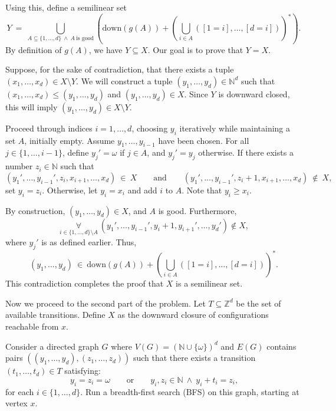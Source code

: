 \documentclass[12pt]{article}
\begin{document}
	Using this, define a semilinear set
	\[ Y \ = \ \bigcup_{A \subseteq \{1, \ldots, d\} \ \wedge \ A \
	\text{is good}} \left( \text{down}(g(A)) + \left( \bigcup_{i \in A}
	([1 = i], \ldots, [d = i]) \right)^{\ast} \right) \text{.} \]
	By definition of \(g(A)\), we have \(Y \subseteq X\). Our goal is to prove
	that \(Y = X\).
	
	\medskip
	
	Suppose, for the sake of contradiction, that there exists a tuple \((x_{1},
	\ldots, x_{d}) \in X \setminus Y\). We will construct a tuple \((y_{1},
	\ldots, y_{d}) \in \mathbb{N}^{d}\) such that \((x_{1}, \ldots, x_{d})
	\leqslant (y_{1}, \ldots, y_{d})\) and \((y_{1}, \ldots, y_{d}) \in X\).
	Since \(Y\) is downward closed, this will imply \((y_{1}, \ldots, y_{d}) \in
	X \setminus Y\).
	
	\medskip
	
	Proceed through indices \(i = 1, \ldots, d\), choosing \(y_{i}\) iteratively
	while maintaining a set \(A\), initially empty. Assume \(y_{1}, \ldots,
	y_{i - 1}\) have been chosen. For all \(j \in \{1, \ldots, i - 1\}\), define
	\(y_{j}' = \omega\) if \(j \in A\), and \(y_{j}' = y_{j}\) otherwise. If
	there exists a number \(z_{i} \in \mathbb{N}\) such that
	\[ (y_{1}', \ldots, y_{i - 1}', z_{i}, x_{i + 1}, \ldots, x_{d}) \ \in \ X
	\qquad \text{and} \qquad (y_{1}', \ldots, y_{i - 1}', z_{i} + 1, x_{i + 1},
	\ldots, x_{d}) \ \notin \ X \text{,} \]
	set \(y_{i} = z_{i}\). Otherwise, let \(y_{i} = x_{i}\) and add \(i\) to
	\(A\). Note that \(y_{i} \geqslant x_{i}\).
	
	\medskip
	
	By construction, \((y_{1}, \ldots, y_{d}) \in X\), and \(A\) is good.
	Furthermore,
	\[ \underset{i \in \{1, \ldots, d\} \setminus A} {\forall} \ (y_{1}',
	\ldots, y_{i - 1}', y_{i} + 1, y_{i + 1}', \ldots, y_{d}') \notin X
	\text{,} \]
	where \(y_{j}'\) is as defined earlier. Thus,
	\[ (y_{1}, \ldots, y_{d}) \ \in \ \text{down}(g(A)) + \left(
	\bigcup_{i \in A} ([1 = i], \ldots, [d = i]) \right)^{\ast} \text{.} \]
	This contradiction completes the proof that \(X\) is a semilinear set.
	
	\medskip
	
	Now we proceed to the second part of the problem. Let \(T \subseteq
	\mathbb{Z}^{d}\) be the set of available transitions. Define \(X\) as the
	downward closure of configurations reachable from \(x\).
	
	\medskip
	
	Consider a directed graph \(G\) where \(V(G) = (\mathbb{N} \cup
	\{\omega\})^{d}\) and \(E(G)\) contains pairs \(((y_{1}, \ldots, y_{d}),
	\allowbreak (z_{1}, \ldots, z_{d}))\) such that there exists a transition
	\((t_{1}, \ldots, t_{d}) \in T\) satisfying:
	\[ y_{i} = z_{i} = \omega \qquad \text{or} \qquad y_{i}, z_{i} \in
	\mathbb{N} \ \wedge \ y_{i} + t_{i} = z_{i} \text{,} \]
	for each \(i \in \{1, \ldots, d\}\). Run a breadth-first search (BFS) on
	this graph, starting at vertex \(x\).
	
\end{document}
